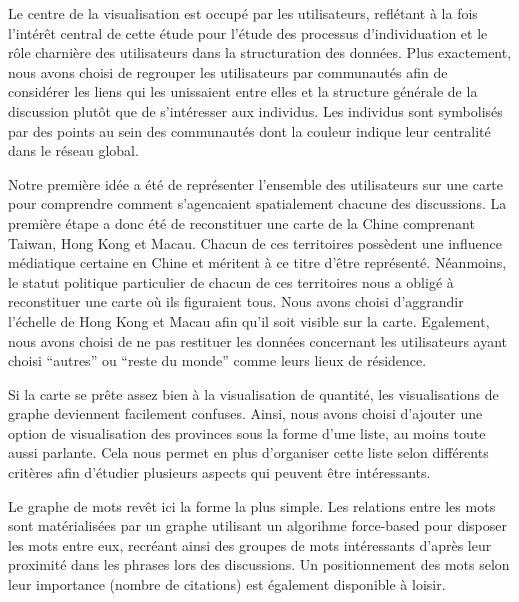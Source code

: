 Le centre de la visualisation est occupé par les utilisateurs,
reflétant à la fois l{\textquoteright}intér\^et central de cette
étude pour l{\textquoteright}étude des processus
d{\textquoteright}individuation et le r\^ole charnière des
utilisateurs dans la structuration des données. Plus exactement, nous
avons choisi de regrouper les utilisateurs par communautés afin de
considérer les liens qui les unissaient entre elles et la structure
générale de la discussion plut\^ot que de
s{\textquoteright}intéresser aux individus. Les individus sont
symbolisés par des points au sein des communautés dont la couleur
indique leur centralité dans le réseau global. 

Notre première idée a été de représenter
l{\textquoteright}ensemble des utilisateurs sur une carte pour
comprendre comment s{\textquoteright}agencaient spatialement chacune
des discussions. La première étape a donc été de reconstituer
une carte de la Chine comprenant Taiwan, Hong Kong et Macau. Chacun de
ces territoires possèdent une influence médiatique certaine en
Chine et méritent à ce titre d{\textquoteright}\^etre
représenté. Néanmoins, le statut politique particulier de chacun
de ces territoires nous a obligé à reconstituer une carte o\`u ils
figuraient tous. Nous avons choisi d{\textquoteright}aggrandir
l{\textquoteright}échelle de Hong Kong et Macau afin
qu{\textquoteright}il soit visible sur la carte. Egalement, nous avons
choisi de ne pas restituer les données concernant les utilisateurs
ayant choisi {\textquotedblleft}autres{\textquotedblright} ou
{\textquotedblleft}reste du monde{\textquotedblright} comme leurs lieux
de résidence.

Si la carte se pr\^ete assez bien à la visualisation de quantité,
les visualisations de graphe deviennent facilement confuses. Ainsi,
nous avons choisi d{\textquoteright}ajouter une option de visualisation
des provinces sous la forme d{\textquoteright}une liste, au moins toute
aussi parlante. Cela nous permet en plus d{\textquoteright}organiser
cette liste selon différents critères afin
d{\textquoteright}étudier plusieurs aspects qui peuvent \^etre
intéressants.

Le graphe de mots rev\^et ici la forme la plus simple. Les relations
entre les mots sont matérialisées par un graphe utilisant un
algorihme force-based pour disposer les mots entre eux, recréant
ainsi des groupes de mots intéressants d{\textquoteright}après leur
proximité dans les phrases lors des discussions. Un positionnement
des mots selon leur importance (nombre de citations) est également
disponible à loisir.

